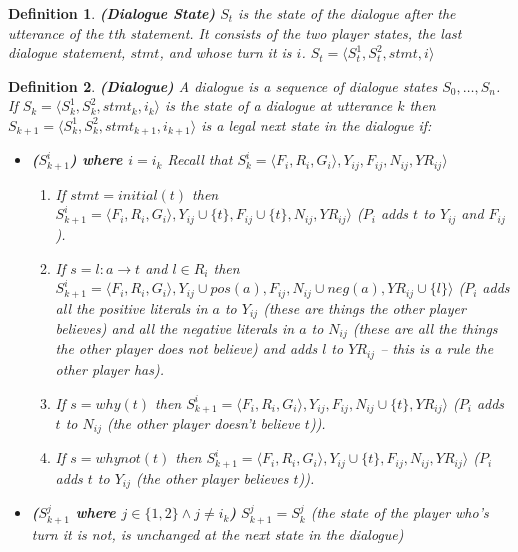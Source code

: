 \documentclass{blue-book}
\newtheorem{definition}{Definition}
\newcommand{\drule}[3]{\ensuremath{#1:#2 \rightarrow #3}}
\begin{document}
\begin{definition}{\bf (Dialogue State)}
$S_{t}$ is the state of the dialogue after the utterance of the $t$th statement. It consists of the two player states, the last dialogue statement, $stmt$, and whose turn it is $i$.  $S_{t} = \langle S^1_{t}, S^2_{t}, stmt, i \rangle$
\end{definition}

\begin{definition}{\bf (Dialogue)}
A dialogue is a sequence of dialogue states $S_0, \ldots, S_n$.
If $S_k = \langle S^1_{k}, S^2_{k}, stmt_k, i_k\rangle$ is the state of a dialogue at utterance $k$ then $S_{k+1} = \langle S^1_{k}, S^2_{k}, stmt_{k + 1}, i_{k + 1}\rangle$ is a legal next state in the dialogue if:

\begin{itemize}

\item  {\bf ($S^i_{k+1}$) where $i = i_k$} Recall that $S^i_k =  \langle F_i, R_i, G_i \rangle, Y_{ij}, F_{ij}, N_{ij}, YR_{ij} \rangle$
\begin{enumerate}
\item If $stmt = initial(t)$ then $S^i_{k+1}= \langle F_i, R_i, G_i \rangle, Y_{ij} \cup \{t\}, F_{ij} \cup \{t\}, N_{ij}, YR_{ij} \rangle$ 
($P_i$ adds $t$ to $Y_{ij}$ and $F_{ij}$).  
\item If $s = \drule{l}{a}{t}$ and $l  \in R_i$ then $S^i_{k + 1} = \langle F_i, R_i, G_i \rangle, Y_{ij} \cup pos(a), F_{ij}, N_{ij} \cup neg(a), YR_{ij} \cup \{l\} \rangle$
($P_i$ adds all the positive literals in $a$ to $Y_{ij}$ (these are things the other player believes) and all the negative literals in $a$ to $N_{ij}$ (these are all the things the other player does not believe) and adds $l$ to $YR_{ij}$ -- this is a rule the other player has). 
\item If $s = why(t)$ then $S^i_{k + 1} = \langle F_i, R_i, G_i \rangle, Y_{ij}  , F_{ij}, N_{ij} \cup \{t\}, YR_{ij} \rangle$ ($P_i$ adds $t$ to $N_{ij}$ (the other player doesn't believe $t$)). 
\item If $s = whynot(t)$ then $S^i_{k + 1} = \langle F_i, R_i, G_i \rangle, Y_{ij} \cup \{t\}, F_{ij}, N_{ij} , YR_{ij} \rangle$  ($P_i$ adds $t$ to $Y_{ij}$ (the other player believes $t$)). 
\end{enumerate}

\item {\bf ($S^j_{k+1}$ where $j \in \{1, 2\} \wedge j \neq i_k$)} $S^j_{k+1} = S^j_{k}$ (the state of the player who's turn it is not, is unchanged at the next state in the dialogue)


\end{itemize}
\end{definition}
\end{document}

